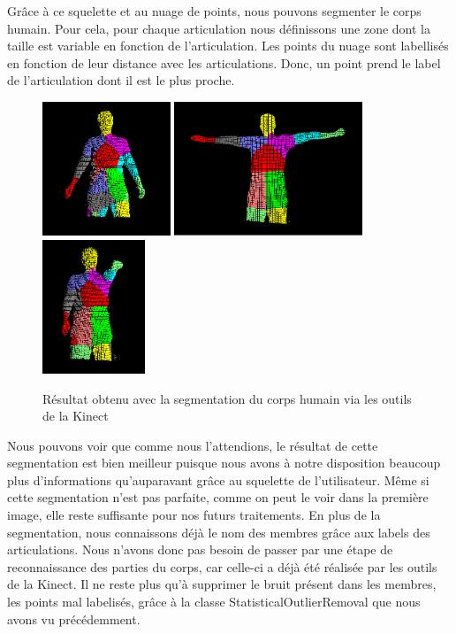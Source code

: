 Grâce à ce squelette et au nuage de points, nous pouvons segmenter le corps humain. Pour cela, pour chaque articulation nous définissons une zone
dont la taille est variable en fonction de l'articulation. Les points du nuage sont labellisés en fonction de leur distance avec les articulations.
Donc, un point prend le label de l'articulation dont il est le plus proche.\\

\begin{figure}[!ht]
  \begin{center}
    \includegraphics[height=4cm]{image/lab1.PNG} 
    \includegraphics[height=4cm]{image/lab2.PNG}
    \includegraphics[height=4cm]{image/lab3.PNG}
    \caption{Résultat obtenu avec la segmentation du corps humain via les outils de la Kinect}
  \end{center}
\end{figure}

Nous pouvons voir que comme nous l'attendions, le résultat de cette segmentation est bien meilleur puisque nous avons à notre disposition
beaucoup plus d'informations qu'auparavant grâce au squelette de l'utilisateur. Même si cette segmentation n'est pas parfaite, comme on peut
le voir dans la première image, elle reste suffisante pour nos futurs traitements. En plus de la segmentation, nous connaissons déjà le nom
des membres grâce aux labels des articulations. Nous n'avons donc pas besoin de passer par une étape de reconnaissance des parties du
corps, car celle-ci a déjà été réalisée par les outils de la Kinect. Il ne reste plus qu'à supprimer le bruit présent dans les membres, les points
mal labelisés, grâce à la classe StatisticalOutlierRemoval que nous avons vu précédemment.

